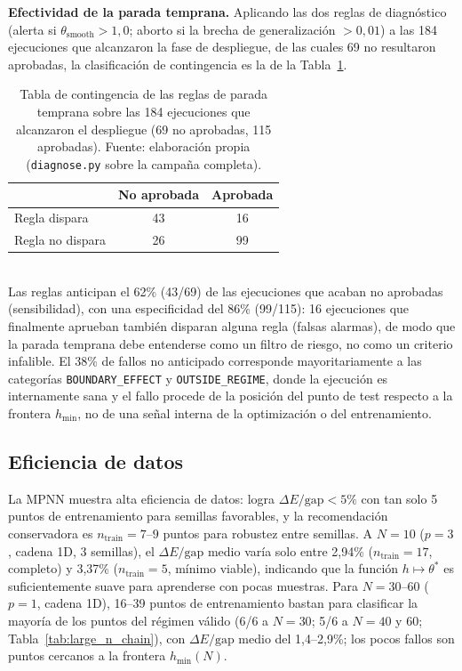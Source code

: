 \documentclass[11pt,a4paper,spanish]{book}
\begin{document}
\textbf{Efectividad de la parada temprana.} Aplicando las dos reglas de diagnóstico (alerta si $\theta_{\text{smooth}} > 1,0$; aborto si la brecha de generalización $> 0,01$) a las 184 ejecuciones que alcanzaron la fase de despliegue, de las cuales 69 no resultaron aprobadas, la clasificación de contingencia es la de la Tabla~\ref{tab:early_stopping}.

\begin{table}[h]
\centering
\caption[Efectividad de la parada temprana]{Tabla de contingencia de las reglas de parada temprana sobre las 184 ejecuciones que alcanzaron el despliegue (69 no aprobadas, 115 aprobadas). Fuente: elaboración propia (\texttt{diagnose.py} sobre la campaña completa).}
\label{tab:early_stopping}
\begin{tabular}{lcc}
\toprule
 & \textbf{No aprobada} & \textbf{Aprobada} \\
\midrule
Regla dispara & 43 & 16 \\
Regla no dispara & 26 & 99 \\
\bottomrule
\end{tabular}
\\[2pt]
\footnotesize Las reglas anticipan el 62\% (43/69) de las ejecuciones que acaban no aprobadas (sensibilidad), con una especificidad del 86\% (99/115): 16 ejecuciones que finalmente aprueban también disparan alguna regla (falsas alarmas), de modo que la parada temprana debe entenderse como un filtro de riesgo, no como un criterio infalible. El 38\% de fallos no anticipado corresponde mayoritariamente a las categorías \texttt{BOUNDARY\_EFFECT} y \texttt{OUTSIDE\_REGIME}, donde la ejecución es internamente sana y el fallo procede de la posición del punto de test respecto a la frontera $h_{\min}$, no de una señal interna de la optimización o del entrenamiento.
\end{table}

\subsection{Eficiencia de datos}
\label{sec:eficiencia_datos}

La MPNN muestra alta eficiencia de datos: logra $\Delta E/\text{gap} < 5\%$ con tan solo 5 puntos de entrenamiento para semillas favorables, y la recomendación conservadora es $n_{\text{train}} = 7$--$9$ puntos para robustez entre semillas. A $N = 10$ ($p = 3$, cadena 1D, 3 semillas), el $\Delta E/\text{gap}$ medio varía solo entre 2,94\% ($n_{\text{train}} = 17$, completo) y 3,37\% ($n_{\text{train}} = 5$, mínimo viable), indicando que la función $h \mapsto \theta^*$ es suficientemente suave para aprenderse con pocas muestras. Para $N = 30$--$60$ ($p = 1$, cadena 1D), 16--39 puntos de entrenamiento bastan para clasificar la mayoría de los puntos del régimen válido (6/6 a $N = 30$; 5/6 a $N = 40$ y $60$; Tabla~\ref{tab:large_n_chain}), con $\Delta E/\text{gap}$ medio del 1,4--2,9\%; los pocos fallos son puntos cercanos a la frontera $h_{\min}(N)$.
\end{document}
